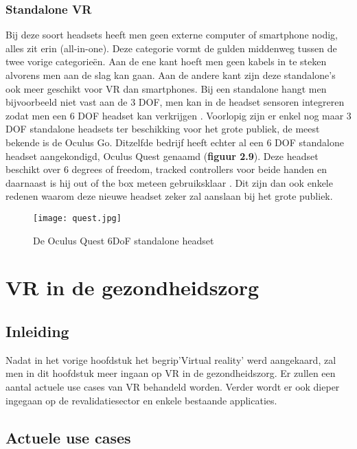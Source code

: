 \subsection{Standalone VR}
Bij deze soort headsets heeft men geen externe computer of smartphone nodig, alles zit erin (all-in-one). Deze categorie vormt de gulden middenweg tussen de twee vorige categorieën. Aan de ene kant hoeft men geen kabels in te steken alvorens men aan de slag kan gaan. Aan de andere kant zijn deze standalone's ook meer geschikt voor VR dan smartphones. Bij een standalone hangt men bijvoorbeeld niet vast aan de 3 DOF, men kan in de headset sensoren integreren zodat men een 6 DOF headset kan verkrijgen  \autocite{Cherdo2018}. Voorlopig zijn er enkel nog maar 3 DOF standalone headsets ter beschikking voor het grote publiek, de meest bekende is de Oculus Go. Ditzelfde bedrijf heeft echter al een 6 DOF standalone headset aangekondigd, Oculus Quest genaamd (\textbf{figuur 2.9}). Deze headset beschikt over 6 degrees of freedom, tracked controllers voor beide handen en daarnaast is hij out of the box meteen gebruiksklaar \autocite{Oculus2019}. Dit zijn dan ook enkele redenen waarom deze nieuwe headset zeker zal aanslaan bij het grote publiek.

\begin{figure}[h]
    \centering
    \texttt{[image: quest.jpg]}
    \caption{De Oculus Quest 6DoF standalone headset \autocite{Oculus2019}}
\end{figure}


\chapter{VR in de gezondheidszorg}
\section{Inleiding}
Nadat in het vorige hoofdstuk het begrip'Virtual reality' werd aangekaard, zal men in dit hoofdstuk meer ingaan op VR in de gezondheidszorg. Er zullen een aantal actuele use cases van VR behandeld worden. Verder wordt er ook dieper ingegaan op de revalidatiesector en enkele bestaande applicaties.

\section{Actuele use cases}
